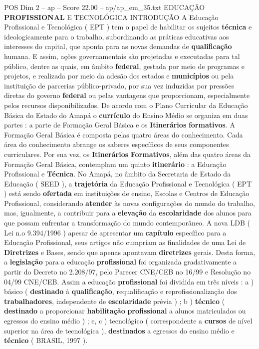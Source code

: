 \begin{textsample}{POS Dim 2 – ap – Score 22.00 – ap/ap\_em\_35.txt}  \label{ex:f2_pos_149}
EDUCAÇÃO \textbf{PROFISSIONAL} E TECNOLÓGICA INTRODUÇÃO A Educação Profissional e Tecnológica ( EPT ) tem o papel de habilitar os sujeitos \textbf{técnica} e ideologicamente para o trabalho, subordinando as práticas educativas aos interesses do capital, que aponta para as novas demandas de \textbf{qualificação} humana.
E assim, ações governamentais são projetadas e executadas para tal público, dentre as quais, em âmbito \textbf{federal}, gestada por meio de programas e projetos, e realizada por meio da adesão dos estados e \textbf{municípios} ou pela instituição de parcerias público-privado, por sua vez induzidas por pressões diretas do governo \textbf{federal} ou pelas vantagens que proporcionam, especialmente pelos recursos disponibilizados.
De acordo com o Plano Curricular da Educação Básica do Estado do Amapá o \textbf{currículo} do Ensino Médio se organiza em duas partes : a parte de Formação Geral Básica e os \textbf{Itinerários} \textbf{formativos}.
A Formação Geral Básica é composta pelas quatro áreas do conhecimento.
Cada área do conhecimento abrange os saberes específicos de seus componentes curriculares.
Por sua vez, os \textbf{Itinerários} \textbf{Formativos}, além das quatro áreas da Formação Geral Básica, contemplam um quinto \textbf{itinerário} : a Educação Profissional e \textbf{Técnica}.
No Amapá, no âmbito da Secretaria de Estado da Educação ( SEED ), a \textbf{trajetória} da Educação Profissional e Tecnológica ( EPT ) está sendo \textbf{ofertada} em instituições de ensino, Escolas e Centros de Educação Profissional, considerando \textbf{atender} às novas configurações do mundo do trabalho, mas, igualmente, a contribuir para a \textbf{elevação} da \textbf{escolaridade} dos alunos para que possam enfrentar a transformação do mundo contemporâneo.
A nova LDB ( Lei n.o 9.394/1996 ) apesar de apresentar um \textbf{capítulo} específico para a Educação Profissional, seus artigos não cumpriam as finalidades de uma Lei de \textbf{Diretrizes} e Bases, sendo que apenas apontavam \textbf{diretrizes} gerais.
Desta forma, a \textbf{legislação} para a educação \textbf{profissional} foi organizada gradativamente a partir do Decreto no 2.208/97, pelo Parecer CNE/CEB no 16/99 e Resolução no 04/99 CNE/CEB.
Assim a educação \textbf{profissional} foi dividida em três níveis : a ) básico ( \textbf{destinado} à \textbf{qualificação}, requalificação e reprofissionalização dos \textbf{trabalhadores}, independente de \textbf{escolaridade} prévia ) ; b ) \textbf{técnico} ( \textbf{destinado} a proporcionar \textbf{habilitação} \textbf{profissional} a alunos matriculados ou egressos do ensino médio ) ; e, c ) tecnológico ( correspondente a \textbf{cursos} de nível superior na área de tecnológica ), \textbf{destinados} a egressos do ensino médio e \textbf{técnico} ( BRASIL, 1997 ).

\end{textsample}
